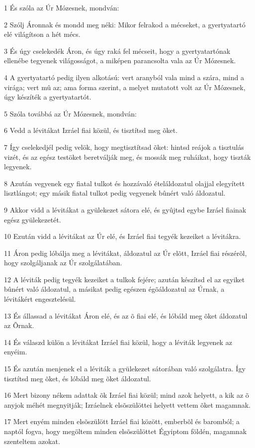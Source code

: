 \par 1 És szóla az Úr Mózesnek, mondván:
\par 2 Szólj Áronnak és mondd meg néki: Mikor felrakod a mécseket, a gyertyatartó elé világítson a hét mécs.
\par 3 És úgy cselekedék Áron, és úgy raká fel mécseit, hogy a gyertyatartónak ellenébe tegyenek világosságot, a miképen parancsolta vala az Úr Mózesnek.
\par 4 A gyertyatartó pedig ilyen alkotású: vert aranyból vala mind a szára, mind a virága; vert mû az; ama forma szerint,  a melyet mutatott volt az Úr Mózesnek, úgy készíték a gyertyatartót.
\par 5 Szóla továbbá az Úr Mózesnek, mondván:
\par 6 Vedd a lévitákat Izráel fiai közül, és tisztítsd meg õket.
\par 7 Így cselekedjél pedig velök, hogy megtisztítsad õket: hintsd reájok a tisztulás vizét, és az egész testöket beretválják meg, és mossák meg ruháikat, hogy tiszták legyenek.
\par 8 Azután vegyenek egy fiatal tulkot és hozzávaló ételáldozatul olajjal elegyített lisztlángot; egy másik fiatal tulkot pedig vegyenek bûnért való áldozatul.
\par 9 Akkor vidd a lévitákat a gyülekezet sátora elé, és gyûjtsd egybe Izráel fiainak egész gyülekezetét.
\par 10 Ezután vidd a lévitákat az Úr elé, és Izráel fiai tegyék kezeiket a lévitákra.
\par 11 Áron pedig lóbálja meg a lévitákat, áldozatul az Úr elõtt, Izráel fiai részérõl, hogy szolgáljanak az Úr szolgálatában.
\par 12 A léviták pedig tegyék kezeiket a tulkok fejére; azután készítsd el az egyiket bûnért való áldozatul, a másikat pedig egészen égõáldozatul az Úrnak, a lévitákért engesztelésül.
\par 13 És állassad a lévitákat Áron elé, és az õ fiai elé, és lóbáld meg õket áldozatul az Õrnak.
\par 14 És válaszd külön a lévitákat Izráel fiai közül, hogy a léviták legyenek az enyéim.
\par 15 És azután menjenek el a léviták a gyülekezet sátorában való szolgálatra. Így tisztítsd meg õket, és lóbáld meg õket áldozatul.
\par 16 Mert bizony nékem adattak õk Izráel fiai közül; mind azok helyett, a kik az õ anyjok méhét megnyitják; Izráelnek elsõszülöttei helyett vettem õket magamnak.
\par 17 Mert enyém minden elsõszülött Izráel fiai között, emberbõl és baromból; a naptól fogva, hogy megöltem minden elsõszülöttet Égyiptom földén, magamnak szenteltem azokat.
